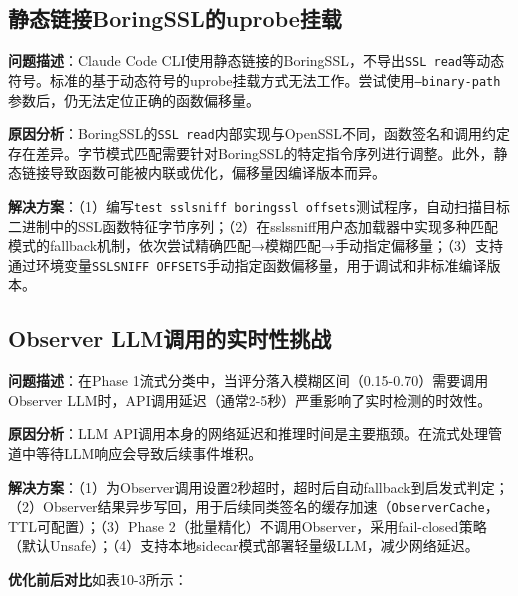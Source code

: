 \documentclass[a4paper]{ctexart}
\makeatletter
\renewcommand{\_}{%
  \ifmmode
    \nfss@text{\textunderscore}%
  \else
    \textunderscore\discretionary{}{}{}%
  \fi}
\makeatother
\begin{document}
\subsection{静态链接BoringSSL的uprobe挂载}



\textbf{问题描述}：Claude Code CLI使用静态链接的BoringSSL，不导出\texttt{SSL\_read}等动态符号。标准的基于动态符号的uprobe挂载方式无法工作。尝试使用\texttt{--binary-path}参数后，仍无法定位正确的函数偏移量。


\textbf{原因分析}：BoringSSL的\texttt{SSL\_read}内部实现与OpenSSL不同，函数签名和调用约定存在差异。字节模式匹配需要针对BoringSSL的特定指令序列进行调整。此外，静态链接导致函数可能被内联或优化，偏移量因编译版本而异。


\textbf{解决方案}：（1）编写\texttt{test\_sslsniff\_boringssl\_offsets}测试程序，自动扫描目标二进制中的SSL函数特征字节序列；（2）在sslssniff用户态加载器中实现多种匹配模式的fallback机制，依次尝试精确匹配→模糊匹配→手动指定偏移量；（3）支持通过环境变量\texttt{SSLSNIFF\_OFFSETS}手动指定函数偏移量，用于调试和非标准编译版本。


\subsection{Observer LLM调用的实时性挑战}



\textbf{问题描述}：在Phase 1流式分类中，当评分落入模糊区间（0.15-0.70）需要调用Observer LLM时，API调用延迟（通常2-5秒）严重影响了实时检测的时效性。


\textbf{原因分析}：LLM API调用本身的网络延迟和推理时间是主要瓶颈。在流式处理管道中等待LLM响应会导致后续事件堆积。


\textbf{解决方案}：（1）为Observer调用设置2秒超时，超时后自动fallback到启发式判定；（2）Observer结果异步写回，用于后续同类签名的缓存加速（\texttt{ObserverCache}，TTL可配置）；（3）Phase 2（批量精化）不调用Observer，采用fail-closed策略（默认Unsafe）；（4）支持本地sidecar模式部署轻量级LLM，减少网络延迟。


\textbf{优化前后对比}如表10-3所示：
\end{document}
